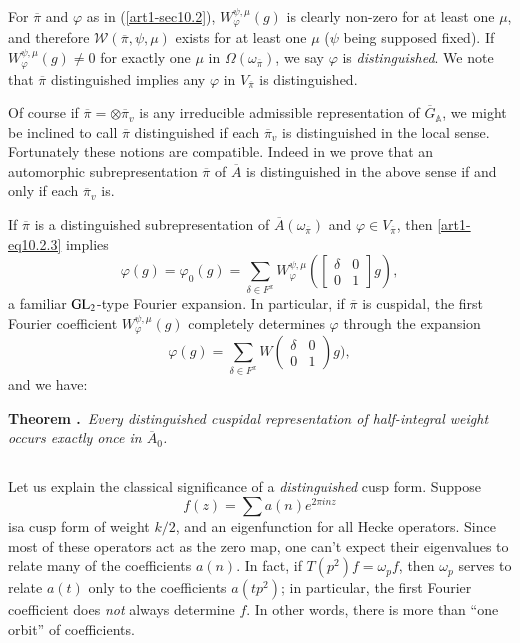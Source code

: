 For $\overline{\pi}$ and $\varphi$ as in (\ref{art1-sec10.2}), $W^{\psi,\mu}_{\varphi}(g)$ is clearly non-zero for at least one $\mu$, and therefore $\mathscr{W}(\overline{\pi},\psi,\mu)$ exists for at least one $\mu$ ($\psi$ being supposed fixed). If $W^{\psi,\mu}_{\varphi}(g)\neq 0$ for exactly one $\mu$ in $\Omega(\omega_{\overline{\pi}})$, we say $\varphi$ is {\em distinguished}. We note that $\overline{\pi}$ distinguished implies any $\varphi$ in $V_{\overline{\pi}}$ is distinguished.

Of course if $\overline{\pi}=\otimes \overline{\pi}_{v}$ is any irreducible admissible representation of $\overline{G}_{\mathbb{A}}$, we might be inclined to call $\overline{\pi}$ distinguished if each $\overline{\pi}_{v}$ is distinguished in the local sense. Fortunately these notions are compatible. Indeed in \cite{GePS2} we prove that an automorphic subrepresentation $\overline{\pi}$ of $\overline{A}$ is distinguished in the above sense if and only if each $\overline{\pi}_{v}$ is.

If $\overline{\pi}$ is a distinguished subrepresentation of $\overline{A}(\omega_{\overline{\pi}})$ and $\varphi\in V_{\overline{\pi}}$, then \eqref{art1-eq10.2.3} implies
\setcounter{equation}{0}
\begin{equation}
\varphi(g)=\varphi_{0}(g)=\sum\limits_{\delta\in F^{x}}W^{\psi,\mu}_{\varphi}\left(\begin{bmatrix} \delta & 0\\ 0 & 1\end{bmatrix}g\right),\label{art1-eq10.3.1}
\end{equation}
a familiar $\mathrm{GL}_{2}$-type Fourier expansion. In particular, if $\overline{\pi}$ is cuspidal, the first Fourier coefficient $W^{\psi,\mu}_{\varphi}(g)$ completely determines $\varphi$ through the expansion
$$
\varphi(g)=\sum\limits_{\delta\in F^{x}}W\left(\begin{matrix} \delta & 0\\ 0 & 1\end{matrix}\right)g),
$$
and we have:

\medskip
\noindent
{\bf Theorem .\label{art1-thm10.3.2}}~{\em Every distinguished cuspidal representation of half-integral weight occurs exactly once in $\overline{A}_{0}$.}
\smallskip

\subsection{}\label{art1-sec10.4}
Let us explain the classical significance of a {\em distinguished} cusp form. Suppose
$$
f(z)=\sum a(n)e^{2\pi inz}
$$
is\pageoriginale a cusp form of weight $k/2$, and an eigenfunction for all Hecke operators. Since most of these operators act as the zero map, one can't expect their eigenvalues to relate many of the coefficients $a(n)$. In fact, if $T(p^{2})f=\omega_{p}f$, then $\omega_{p}$ serves to relate $a(t)$ only to the coefficients $a(tp^{2})$; in particular, the first Fourier coefficient does {\em not} always determine $f$. In other words, there is more than ``one orbit'' of coefficients.

